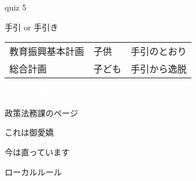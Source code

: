 \documentclass[
  ignorenonframetext,
  aspectratio=169]{beamer}
\begin{document}
\begin{frame}{quiz 5}
\protect\hypertarget{quiz-5}{}
\Huge

手引 or 手引き

\bigskip

\large

\raggedleft
\textcolor{white}{\begin{tabular}{@{}lll@{}}\toprule
教育振興基本計画&子供&手引のとおり\\
総合計画&子ども&手引から逸脱\\\bottomrule
\end{tabular}}

\vfill

\textcolor{white}{「子供と親のサポートセンター」とはいえない}
\end{frame}

\begin{frame}{政策法務課のページ}
\protect\hypertarget{ux653fux7b56ux6cd5ux52d9ux8ab2ux306eux30daux30fcux30b8}{}
\end{frame}

\begin{frame}{これは御愛嬌}
\protect\hypertarget{ux3053ux308cux306fux5fa1ux611bux5b0c}{}
\end{frame}

\begin{frame}{今は直っています}
\protect\hypertarget{ux4ecaux306fux76f4ux3063ux3066ux3044ux307eux3059}{}
\vspace*{-20pt}
\end{frame}

\begin{frame}{}
\protect\hypertarget{section-6}{}
\LARGE

\raggedleft
 \scalebox{1.4}{体裁は、もちろん、手引に従って}

\pause
\vfill

\scalebox{1.1}{でもほどほどに}

\scalebox{1.1}{スピード感を意識しましょう}
\end{frame}

\begin{frame}{}
\protect\hypertarget{section-7}{}
\Huge

ローカルルール
\end{frame}
\end{document}
